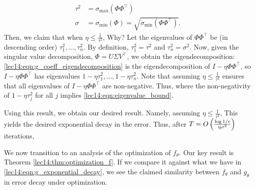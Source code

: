 \begin{align}
    \tau^2 &= \sigma_{\text{max}}(\Phi \Phi^\top) \\
    \sigma &= \sigma_\text{min}(\Phi) = \sqrt{\sigma_\text{min}(\Phi\Phi^\top)}. \label{lec14:eqn:sigma_def}
\end{align}
Then, we claim that when $\eta \leq \frac{1}{\tau^2}$,
Why? Let the eigenvalues of $\Phi \Phi^\top$ be (in descending order) $\tau_1^2, \dots , \tau_n^2$. By definition, $\tau_1^2 = \tau^2$ and $\tau_n^2 = \sigma^2$. Now, given the singular value decomposition, $\Phi = U\Sigma V^\top$, we obtain the eigendecomposition: 
\eqref{lec14:eqn:g_coeff_eigendecomposition} is the eigendecomposition of $I - \eta \Phi \Phi^\top$, so $I - \eta \Phi \Phi^\top$ has eigenvalues $1 - \eta \tau_1^2, \dots, 1 - \eta \tau_n^2$.
 Note that assuming $\eta \leq \frac{1}{\tau^2}$ ensures that all eigenvalues of $I - \eta \Phi \Phi^\top$ are non-negative. Thus,
where the non-negativity of $1 - \eta \tau_j^2$ for all $j$ implies \eqref{lec14:eqn:eigenvalue_bound}.

Using this result, we obtain our desired result. Namely, assuming $\eta \leq \frac{1}{\tau^2}$,
This yields the desired exponential decay in the error. Thus, after $T = O \left( \frac{\log 1/\epsilon}{\eta \sigma^2}\right)$ iterations, 

We now transition to an analysis of the optimization of $f_{\theta}$. Our key result is Theorem \ref{lec14:thm:optimization_f}. If we compare it against what we have in \eqref{lec14:eqn:g_exponential_decay}, we see the claimed similarity between $f_\theta$ and $g_\theta$ in error decay under optimization. 

